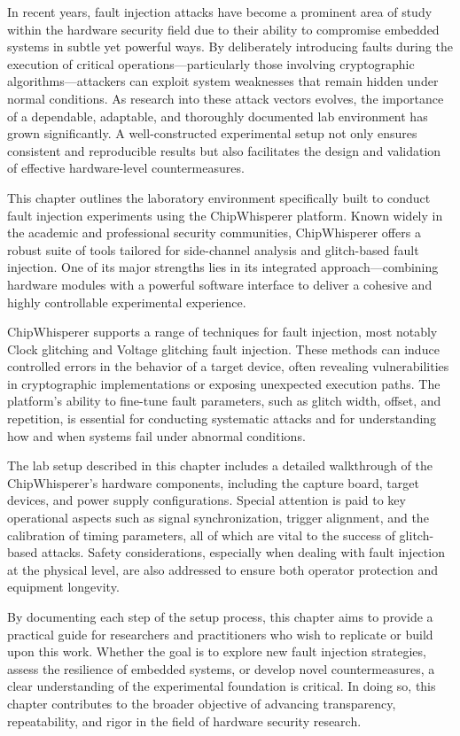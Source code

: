  In recent years, fault injection attacks have become a prominent area of study within the hardware security field due to their ability to compromise embedded systems in subtle yet powerful ways. By deliberately introducing faults during the execution of critical operations—particularly those involving cryptographic algorithms—attackers can exploit system weaknesses that remain hidden under normal conditions. As research into these attack vectors evolves, the importance of a dependable, adaptable, and thoroughly documented lab environment has grown significantly. A well-constructed experimental setup not only ensures consistent and reproducible results but also facilitates the design and validation of effective hardware-level countermeasures.

 This chapter outlines the laboratory environment specifically built to conduct fault injection experiments using the ChipWhisperer platform. Known widely in the academic and professional security communities, ChipWhisperer offers a robust suite of tools tailored for side-channel analysis and glitch-based fault injection. One of its major strengths lies in its integrated approach—combining hardware modules with a powerful software interface to deliver a cohesive and highly controllable experimental experience.
 
 ChipWhisperer \cite{chipwhisperer2025} supports a range of techniques for fault injection, most notably Clock glitching and Voltage glitching fault injection. These methods can induce controlled errors in the behavior of a target device, often revealing vulnerabilities in cryptographic implementations or exposing unexpected execution paths. The platform’s ability to fine-tune fault parameters, such as glitch width, offset, and repetition, is essential for conducting systematic attacks and for understanding how and when systems fail under abnormal conditions.
 
 The lab setup described in this chapter includes a detailed walkthrough of the ChipWhisperer’s hardware components, including the capture board, target devices, and power supply configurations. Special attention is paid to key operational aspects such as signal synchronization, trigger alignment, and the calibration of timing parameters, all of which are vital to the success of glitch-based attacks. Safety considerations, especially when dealing with fault injection at the physical level, are also addressed to ensure both operator protection and equipment longevity.
 
 By documenting each step of the setup process, this chapter aims to provide a practical guide for researchers and practitioners who wish to replicate or build upon this work. Whether the goal is to explore new fault injection strategies, assess the resilience of embedded systems, or develop novel countermeasures, a clear understanding of the experimental foundation is critical. In doing so, this chapter contributes to the broader objective of advancing transparency, repeatability, and rigor in the field of hardware security research.
